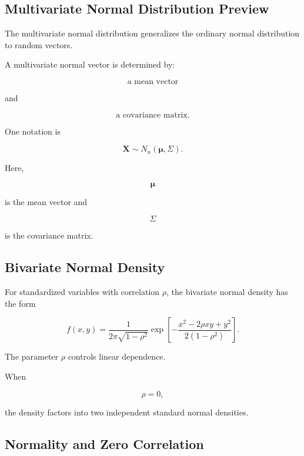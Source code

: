 \subsection{Multivariate Normal Distribution Preview}
\label{subsec:multivariate-normal-preview}

The multivariate normal distribution generalizes the ordinary normal
distribution to random vectors.

A multivariate normal vector is determined by:

\[
\boxed{
\text{a mean vector}
}
\]

and

\[
\boxed{
\text{a covariance matrix}.
}
\]

One notation is

\[
\boxed{
\mathbf{X}
\sim
N_n(\boldsymbol{\mu},\Sigma).
}
\]

Here,

\[
\boldsymbol{\mu}
\]

is the mean vector and

\[
\Sigma
\]

is the covariance matrix.

\subsection{Bivariate Normal Density}
\label{subsec:bivariate-normal-density-preview}

For standardized variables with correlation \(\rho\), the bivariate
normal density has the form

\[
\boxed{
f(x,y)
=
\frac{
1
}{
2\pi\sqrt{1-\rho^2}
}
\exp
\left[
-
\frac{
x^2-2\rho xy+y^2
}{
2(1-\rho^2)
}
\right].
}
\]

The parameter \(\rho\) controls linear dependence.

When

\[
\rho=0,
\]

the density factors into two independent standard normal densities.

\subsection{Normality and Zero Correlation}
\label{subsec:normal-zero-correlation}


